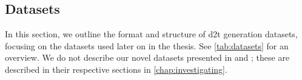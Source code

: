 

\subsection{Datasets}
\label{sec:datasets}

In this section, we outline the format and structure of \ac{d2t} generation datasets, focusing on the datasets used later on in the thesis. See \autoref{tab:datasets} for an overview. We do not describe our novel datasets presented in \citet{kasnerMindLabelsDescribing2022} and \citet{kasnerReferenceBasedMetricsAnalyzing2024}; these are described in their respective sections in \autoref{chap:investigating}.

